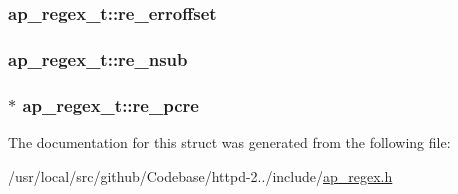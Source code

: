 \subsubsection[{\texorpdfstring{re\+\_\+erroffset}{re_erroffset}}]{ ap\+\_\+regex\+\_\+t\+::re\+\_\+erroffset}\hypertarget{structap__regex__t_a253ebead3ef72994a5229ef289c20115}{}\label{structap__regex__t_a253ebead3ef72994a5229ef289c20115}
\subsubsection[{\texorpdfstring{re\+\_\+nsub}{re_nsub}}]{ ap\+\_\+regex\+\_\+t\+::re\+\_\+nsub}\hypertarget{structap__regex__t_a85fab6fecaa820ff491ff80ae141e7ee}{}\label{structap__regex__t_a85fab6fecaa820ff491ff80ae141e7ee}
\subsubsection[{\texorpdfstring{re\+\_\+pcre}{re_pcre}}]{$\ast$ ap\+\_\+regex\+\_\+t\+::re\+\_\+pcre}\hypertarget{structap__regex__t_aed475699de716bc65eed600817604d4e}{}\label{structap__regex__t_aed475699de716bc65eed600817604d4e}


The documentation for this struct was generated from the following file\+:\begin{DoxyCompactItemize}
\item 
/usr/local/src/github/\+Codebase/httpd-\/2../include/\hyperlink{ap__regex_8h}{ap\+\_\+regex.\+h}\end{DoxyCompactItemize}
